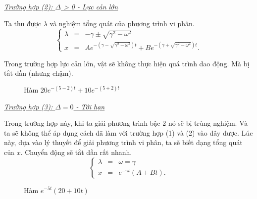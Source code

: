 \documentclass[12pt]{article}
\begin{document}
\newpage
\vspace{2mm}

\underline{\textit{Trường hợp (2): \(\Delta\) > 0 - Lực cản lớn}}

Ta thu được \(\lambda\) và nghiệm tổng quát của phương trình vi phân.
\begin{equation}
    \left\{
    \begin{array}{ccc}
    \lambda &=& - \gamma \pm   \sqrt{\gamma^2 - \omega^2} \\
    x &=& A e^{- \left( \gamma - \sqrt{\gamma^2 - \omega^2}\right)  t} + B e^{- \left( \gamma + \sqrt{\gamma^2 - \omega^2}\right) t}.
    \end{array}
    \right.
    \label{eq:1.13}
\end{equation}

Trong trường hợp lực cản lớn, vật sẽ không thực hiện quá trình dao động. Mà bị tắt dần (nhưng chậm).

\begin{figure}[!htb]
    \centering
    \caption{Hàm \(20 e^{-(5-2)t} + 10 e^{-(5+2)t}\)}
    \label{fig:1.7}
\end{figure}
\vspace{2mm}

\underline{\textit{Trường hợp (3): \(\Delta = 0\) - Tới hạn}}

Trong trường hợp này, khi ta giải phương trình bậc 2 nó sẽ bị trùng nghiệm. Và ta sẽ không thể áp dụng cách đã làm với trường hợp (1) và (2) vào đây được. Lúc này, dựa vào lý thuyết để giải phương trình vi phân, ta sẽ biết dạng tổng quát của \(x\). Chuyển động sẽ tắt dần rất nhanh. 
\begin{equation}
    \left\{
    \begin{array}{ccc}
    \lambda &=& \omega = \gamma \\
    x &=& e^{-\gamma t} \left( A + B t\right).
    \end{array}
    \right.
    \label{eq:1.14}
\end{equation}

\begin{figure}[!htb]
    \centering
    \caption{Hàm \(e^{-5t} \left(20 + 10t\right)\)}
    \label{fig:1.8}
\end{figure}
\vspace{2mm}
\end{document}
